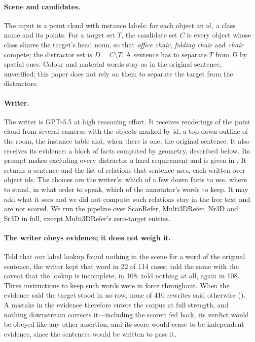 \paragraph{Scene and candidates.}
The input is a point cloud with instance labels: for each object an id, a class name and its points.
For a target set $T$, the candidate set $C$ is every object whose class shares the target's head noun, so that \emph{office chair}, \emph{folding chair} and \emph{chair} compete; the distractor set is $D = C \setminus T$.
A sentence has to separate $T$ from $D$ by spatial cues.
Colour and material words stay as in the original sentence, unverified; this paper does not rely on them to separate the target from the distractors.

\paragraph{Writer.}
The writer is GPT-5.5 at high reasoning effort.
It receives renderings of the point cloud from several cameras with the objects marked by id, a top-down outline of the room, the instance table and, when there is one, the original sentence.
It also receives its evidence: a block of facts computed by geometry, described below.
Its prompt makes excluding every distractor a hard requirement and is given in .
It returns a sentence and the list of relations that sentence uses, each written over object ids.
The choices are the writer's: which of a few dozen facts to use, where to stand, in what order to speak, which of the annotator's words to keep.
It may add what it sees and we did not compute; such relations stay in the free text and are not scored.
We run the pipeline over ScanRefer, Multi3DRefer, Nr3D and Sr3D in full, except Multi3DRefer's zero-target entries.

\paragraph{The writer obeys evidence; it does not weigh it.}
Told that our label lookup found nothing in the scene for a word of the original sentence, the writer kept that word in 22 of 114 cases; told the same with the caveat that the lookup is incomplete, in 108; told nothing at all, again in 108.
Three instructions to keep such words were in force throughout.
When the evidence said the target stood in no row, none of 410 rewrites said otherwise ().
A mistake in the evidence therefore enters the corpus at full strength, and nothing downstream corrects it---including the scorer: fed back, its verdict would be obeyed like any other assertion, and its score would cease to be independent evidence, since the sentences would be written to pass it.


